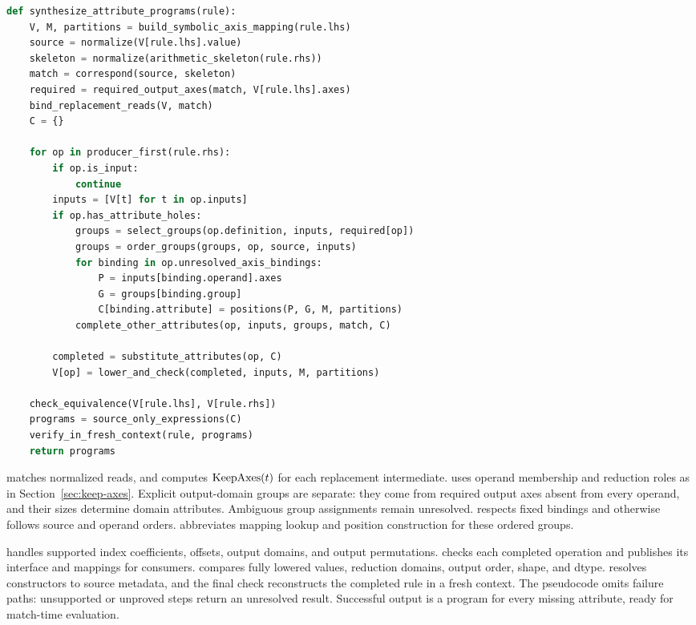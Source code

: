 \begin{paperalgorithm}[H]
\caption{Synthesize attribute programs.}\label{alg:synthesis}
\begin{lstlisting}[language=Python]
def synthesize_attribute_programs(rule):
    V, M, partitions = build_symbolic_axis_mapping(rule.lhs)
    source = normalize(V[rule.lhs].value)
    skeleton = normalize(arithmetic_skeleton(rule.rhs))
    match = correspond(source, skeleton)
    required = required_output_axes(match, V[rule.lhs].axes)
    bind_replacement_reads(V, match)
    C = {}

    for op in producer_first(rule.rhs):
        if op.is_input:
            continue
        inputs = [V[t] for t in op.inputs]
        if op.has_attribute_holes:
            groups = select_groups(op.definition, inputs, required[op])
            groups = order_groups(groups, op, source, inputs)
            for binding in op.unresolved_axis_bindings:
                P = inputs[binding.operand].axes
                G = groups[binding.group]
                C[binding.attribute] = positions(P, G, M, partitions)
            complete_other_attributes(op, inputs, groups, match, C)

        completed = substitute_attributes(op, C)
        V[op] = lower_and_check(completed, inputs, M, partitions)

    check_equivalence(V[rule.lhs], V[rule.rhs])
    programs = source_only_expressions(C)
    verify_in_fresh_context(rule, programs)
    return programs
\end{lstlisting}
\end{paperalgorithm}

 matches normalized reads, and 
computes $\operatorname{KeepAxes}(t)$ for each replacement intermediate. 
uses operand membership and reduction roles as in
Section~\ref{sec:keep-axes}. Explicit output-domain groups are separate: they
come from required output axes absent from every operand, and their sizes
determine domain attributes. Ambiguous group assignments remain unresolved.
 respects fixed bindings and otherwise follows source
and operand orders.  abbreviates mapping lookup and position
construction for these ordered groups.

 handles supported index coefficients,
offsets, output domains, and output permutations. 
checks each completed operation and publishes its interface and mappings for
consumers.  compares fully lowered values, reduction
domains, output order, shape, and dtype. 
resolves constructors to source metadata, and the final check reconstructs
the completed rule in a fresh context. The pseudocode omits failure paths:
unsupported or unproved steps return an unresolved result. Successful output
is a program for every missing attribute, ready for match-time evaluation.
